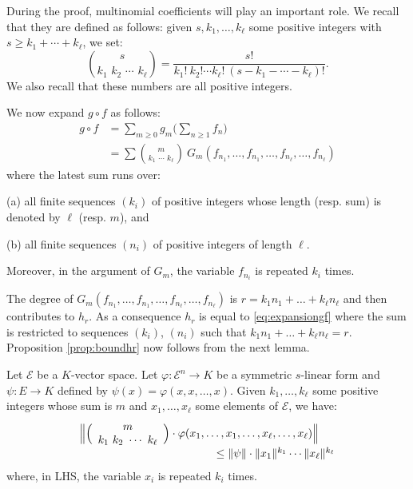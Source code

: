\documentclass{sig-alternate}
\begin{document}
During the proof, multinomial coefficients will play an important role. 
We recall that they are defined as follows: 
given $s, k_1, \ldots, k_\ell$ some positive integers with $s \geq
k_1 + \cdots + k_\ell$, we set:
$$\binom s {k_1 \,\, k_2 \,\, \cdots \,\, k_\ell} =
  \frac{s!}{k_1!\: k_2! \cdots k_\ell! \: (s{-}k_1{-}\cdots{-}k_\ell)!}.$$
We also recall that these numbers are all positive integers.

We now expand $g \circ f$ as follows:
\begin{align}
g \circ f & = \sum_{m \geq 0} g_m \Big(\sum_{n \geq 1} f_n\Big) \nonumber \\
& = \sum \binom m {\!k_1 \,\, \cdots \,\, k_\ell\!} \:
G_m(f_{n_1}, \ldots, f_{n_1}, \ldots, f_{n_\ell}, \ldots, f_{n_\ell})
\label{eq:expansiongf}
\end{align}
where the latest sum runs over:

\noindent
(a) all finite sequences $(k_i)$ of positive integers whose length 
(resp. sum) is denoted by $\ell$ (resp. $m$), and

\noindent
(b) all finite sequences $(n_i)$ of positive integers of length
$\ell$.

\noindent
Moreover, in the argument of $G_m$, the variable $f_{n_i}$ 
is repeated $k_i$ times.

The degree of $G_m(f_{n_1}, \ldots, f_{n_1}, \ldots, f_{n_\ell},
\ldots, f_{n_\ell})$ is $r = k_1 n_1 + \ldots + k_\ell n_\ell$ and 
then contributes to $h_r$. As a consequence $h_r$ is equal to 
\eqref{eq:expansiongf} where the sum is restricted to sequences
$(k_i)$, $(n_i)$ such that $k_1 n_1 + \ldots + k_\ell n_\ell = r$.
Proposition \ref{prop:boundhr} now follows from the next lemma.

\begin{lem}
Let $\mathcal E$ be a $K$-vector space. Let $\varphi : \mathcal E^n \to 
K$ be a symmetric $s$-linear form and $\psi: E \to K$ defined by 
$\psi(x) = \varphi(x, x, \ldots, x)$.
Given $k_1, \ldots, k_\ell$ some positive integers whose sum is $m$ and 
$x_1, \ldots, x_\ell$ some elements of $\mathcal E$, we have:
$$\begin{array}{l}
\Big\Vert \binom m {k_1 \,\, k_2 \,\, \cdots \,\, k_\ell} \cdot
\varphi(x_1, \ldots, x_1, \ldots, x_\ell, \ldots,
x_\ell) \Big\Vert  \\
\hspace{4.3cm} \leq \Vert \psi \Vert \cdot \Vert x_1 \Vert^{k_1} \cdots
 \Vert x_\ell \Vert^{k_\ell}
\end{array}$$
where, in LHS, the variable $x_i$ is repeated $k_i$ times.
\end{lem}
\end{document}
